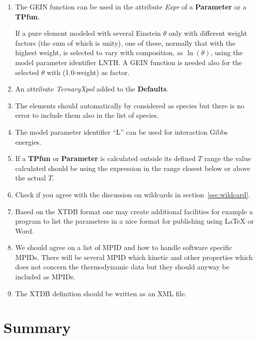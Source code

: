 \documentclass{article}
\begin{document}
\begin{enumerate}
\item The GEIN function can be used in the attribute {\em Expr} of a {\bf
  Parameter} or a {\bf TPfun}.

  If a pure element modeled with several Einstein $\theta$ only with
  different weight factors (the sum of which is unity), one of these,
  normally that with the highest weight, is selected to vary with
  composition, as $\ln(\theta)$, using the model parameter identifier
  LNTH.  A GEIN function is needed also for the selected $\theta$ with
  (1.0-weight) as factor.

\item An attribute {\em TernaryXpol} added to the {\bf Defaults}.

\item The elements should automatically by considered as species but
  there is no error to include them also in the list of species.

\item The model parameter identifier ``L'' can be used for interaction
  Gibbs energies.

\item If a {\bf TPfun} or {\bf Parameter} is calculated outside its
  defined $T$ range the value calculated should be using the
  expression in the range closest below or above the actual $T$. 

\item Check if you agree with the discussion on wildcards in
  section~\ref{sec:wildcard}.

\item Based on the XTDB format one may create additional facilities
  for example a program to list the parameters in a nice format for
  publishing using LaTeX or Word.

\item We should agree on a list of MPID and how to handle software
  specific MPIDs.  There will be several MPID which kinetic and other
  properties which does not concern the thermodynamic data but they
  should anyway be included as MPIDs.

\item The XTDB definition should be written as an XML file.
  
\end{enumerate}

\section{Summary}
\end{document}
